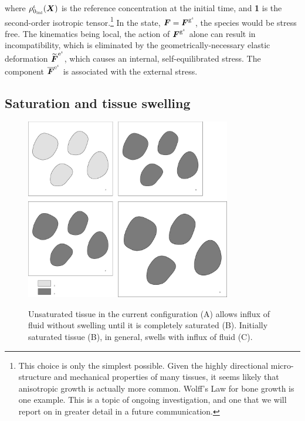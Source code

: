 \noindent where
$\rho_{0_{\mathrm{ini}}}^\iota(\mbox{\boldmath$ X$})$ is the reference concentration at the
initial time, and {\bf 1} is the second-order isotropic
tensor.\footnote{This choice is only the simplest possible. Given the
  highly directional micro-structure and mechanical properties of many
  tissues, it seems likely that anisotropic growth is actually 
  more common. Wolff's Law for bone growth is one example. This is a
  topic of ongoing investigation, and one that we will report on in
  greater detail in a future communication.} In 
the state, $\mbox{\boldmath$ F$} = \mbox{\boldmath$ F$}^{\mathrm{g}^\iota}$, the species would be stress
free. The kinematics being local, the
action of $\mbox{\boldmath$ F$}^{\mathrm{g}^\iota}$ alone can result in
incompatibility, which is eliminated by the geometrically-necessary
elastic deformation
$\widetilde{\mbox{\boldmath$ F$}}^{\mathrm{e}^{\mathrm{\iota}}}$, which causes an
internal, self-equilibrated stress. The component
$\overline{\mbox{\boldmath$ F$}}^{\mathrm{e}^\iota}$ is associated with the external stress.

\subsection{Saturation and tissue swelling}
\label{saturation-and-swelling}

\begin{figure}[ht]
\centering 
{\includegraphics[width=0.8\textwidth]{images/elucidation/composite}}

\caption{Unsaturated tissue in the current configuration (A) allows
  influx of fluid 
  without swelling until it is completely saturated (B). Initially
  saturated tissue (B), in general, swells with influx of fluid (C).}

\label{satswelfig}
\end{figure}

